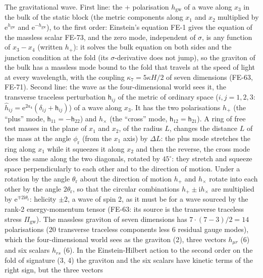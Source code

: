 \documentclass[
  10pt,
]{article}
\begin{document}
The gravitational wave. First line: the + polarisation
\(h_{\mathrm{gw}}\) of a wave along \(x_3\) in the bulk of the static
block (the metric components along \(x_1\) and \(x_2\) multiplied by
\(\mathrm{e}^{h_{\mathrm{gw}}}\) and \(\mathrm{e}^{-h_{\mathrm{gw}}}\)),
to the first order: Einstein's equation FE-1 gives the equation of the
massless scalar FE-73, and the zero mode, independent of \(\sigma\), is
any function of \(x_3 - x_4\) (written \(h_{+}\)): it solves the bulk
equation on both sides and the junction condition at the fold (its
\(\sigma\)-derivative does not jump), so the graviton of the bulk has a
massless mode bound to the fold that travels at the speed of light at
every wavelength, with the coupling \(\kappa_7 = 5\kappa H/2\) of seven
dimensions (FE-63, FE-71). Second line: the wave as the four-dimensional
world sees it, the transverse traceless perturbation \(\mathsf{h}_{ij}\)
of the metric of ordinary space (\(i, j = 1, 2, 3\):
\(\hat h_{ij} = \mathrm{e}^{2a_4}(\delta_{ij} + \mathsf{h}_{ij})\)) of a
wave along \(x_3\). It has the two polarisations \(h_{+}\) (the ``plus''
mode, \(\mathsf{h}_{11} = -\mathsf{h}_{22}\)) and \(h_{\times}\) (the
``cross'' mode, \(\mathsf{h}_{12} = \mathsf{h}_{21}\)). A ring of free
test masses in the plane of \(x_1\) and \(x_2\), of the radius \(L\),
changes the distance \(L\) of the mass at the angle
\(\phi_{\mathrm{r}}\) (from the \(x_1\) axis) by \(\Delta L\): the plus
mode stretches the ring along \(x_1\) while it squeezes it along \(x_2\)
and then the reverse, the cross mode does the same along the two
diagonals, rotated by \(45^\circ\): they stretch and squeeze space
perpendicularly to each other and to the direction of motion. Under a
rotation by the angle \(\theta_{\mathrm{r}}\) about the direction of
motion \(h_{+}\) and \(h_{\times}\) rotate into each other by the angle
\(2\theta_{\mathrm{r}}\), so that the circular combinations
\(h_{+} \pm \mathrm{i}h_{\times}\) are multiplied by
\(\mathrm{e}^{\mp2\mathrm{i}\theta_{\mathrm{r}}}\): helicity \(\pm2\), a
wave of spin 2, as it must be for a wave sourced by the rank-2
energy-momentum tensor (FE-63: its source is the transverse traceless
stress \(\Pi_{\mathrm{gw}}\)). The massless graviton of seven dimensions
has \(7\cdot(7 - 3)/2 = 14\) polarisations (20 transverse traceless
components less 6 residual gauge modes), which the four-dimensional
world sees as the graviton (2), three vectors \(h_{\mu r}\) (6) and six
scalars \(h_{rs}\) (6). In the Einstein-Hilbert action to the second
order on the fold of signature (3, 4) the graviton and the six scalars
have kinetic terms of the right sign, but the three vectors
\end{document}
